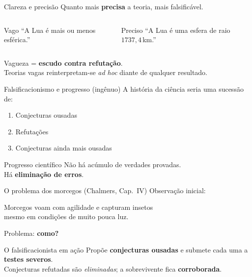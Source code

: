 \documentclass[aspectratio=169]{beamer}
\newcommand{\impt}[1]{\textcolor{maccent}{\textbf{#1}}}
\newcommand{\ntc}[1]{\textcolor{mprimary}{#1}}
\begin{document}
\begin{frame}{Clareza e precisão}
Quanto mais \impt{precisa} a teoria, mais falsificável.
\vspace{0.5cm}
\pause
\begin{columns}[t]
\begin{block}{Vago}
``A Lua é mais ou menos esférica.''
\end{block}

\pause
\begin{block}{Preciso}
``A Lua é uma esfera de raio $1737{,}4$\,km.''
\end{block}
\end{columns}
\vspace{0.5cm}
\pause
\begin{alertblock}{}
Vagueza = \impt{escudo contra refutação}. \\
Teorias vagas reinterpretam-se \emph{ad hoc} diante de qualquer resultado.
\end{alertblock}
\end{frame}

\begin{frame}{Falsificacionismo e progresso (ingênuo)}
A história da ciência seria uma sucessão de:
\vspace{0.3cm}
\begin{enumerate}
  \item Conjecturas ousadas
  \pause
  \item Refutações
  \pause
  \item Conjecturas ainda mais ousadas
\end{enumerate}
\pause
\vspace{0.5cm}
\begin{block}{Progresso científico}
Não há acúmulo de verdades provadas. \\
Há \impt{eliminação de erros}.
\end{block}
\end{frame}
\begin{frame}{O problema dos morcegos (Chalmers, Cap.~IV)}
\ntc{Observação inicial:} 
\vspace{0.2cm}
\begin{block}{}
\centering Morcegos voam com agilidade e capturam insetos \\ mesmo em condições de muito pouca luz.
\end{block}
\pause
\vspace{0.3cm}
\ntc{Problema:} \impt{como?}
\pause
\vspace{0.4cm}
\begin{alertblock}{O falsificacionista em ação}
Propõe \impt{conjecturas ousadas} e submete cada uma a \impt{testes severos}. \\
Conjecturas refutadas são \emph{eliminadas}; a sobrevivente fica \impt{corroborada}.
\end{alertblock}
\end{frame}
\end{document}
